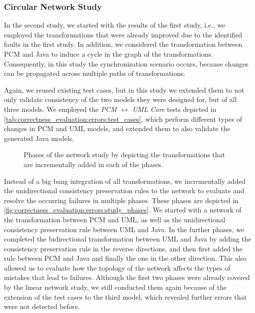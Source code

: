\subsubsection*{Circular Network Study} 

In the second study, we started with the results of the first study, i.e., we employed the transformations that were already improved due to the identified faults in the first study.
In addition, we considered the transformation between \gls{PCM} and Java to induce a cycle in the graph of the transformations.
Consequently, in this study the synchronization scenario occurs, because changes can be propagated across multiple paths of transformations.

Again, we reused existing test cases, but in this study we extended them to not only validate consistency of the two models they were designed for, but of all three models.
We employed the \emph{PCM $\leftrightarrow$ UML Core} tests depicted in \autoref{tab:correctness_evaluation:errors:test_cases}, which perform different types of changes in \gls{PCM} and \gls{UML} models, and extended them to also validate the generated Java models.

\begin{figure}
    \centering
    
    \caption[Phases of second case study]{Phases of the network study by depicting the transformations that are incrementally added in each of the phases.}
    \label{fig:correctness_evaluation:errors:study_phases}
\end{figure}

Instead of a big bang integration of all transformations, we incrementally added the unidirectional consistency preservation rules to the network to evaluate and resolve the occurring failures in multiple phases.
These phases are depicted in \autoref{fig:correctness_evaluation:errors:study_phases}.
We started with a network of the transformation between \gls{PCM} and \gls{UML}, as well as the unidirectional consistency preservation rule between \gls{UML} and Java.
In the further phases, we completed the bidirectional transformation between \gls{UML} and Java by adding the consistency preservation rule in the reverse directions, and then first added the rule between \gls{PCM} and Java and finally the one in the other direction.
This also allowed us to evaluate how the topology of the network affects the types of mistakes that lead to failures.
Although the first two phases were already covered by the linear network study, we still conducted them again because of the extension of the test cases to the third model, which revealed further errors that were not detected before.

